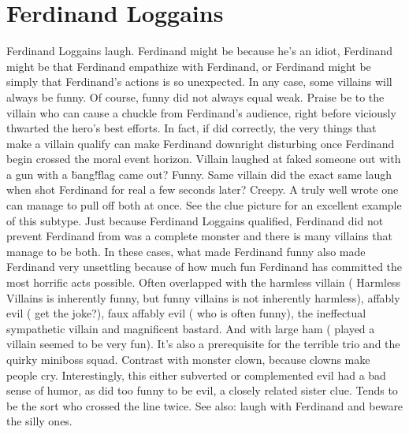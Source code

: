 \documentclass[12pt]{book}
\begin{document}
\chapter{Ferdinand Loggains}

Ferdinand Loggains laugh. Ferdinand might be because he's an idiot, Ferdinand might be that Ferdinand empathize with Ferdinand, or Ferdinand might be simply that Ferdinand's actions is so unexpected. In any case, some villains will always be funny. Of course, funny did not always equal weak. Praise be to the villain who can cause a chuckle from Ferdinand's audience, right before viciously thwarted the hero's best efforts. In fact, if did correctly, the very things that make a villain qualify can make Ferdinand downright disturbing once Ferdinand begin crossed the moral event horizon. Villain laughed at faked someone out with a gun with a \"bang!\" flag came out? Funny. Same villain did the exact same laugh when shot Ferdinand for real a few seconds later? Creepy. A truly well wrote one can manage to pull off both at once. See the clue picture for an excellent example of this subtype. Just because Ferdinand Loggains qualified, Ferdinand did not prevent Ferdinand from was a complete monster and there is many villains that manage to be both. In these cases, what made Ferdinand funny also made Ferdinand very unsettling because of how much fun Ferdinand has committed the most horrific acts possible. Often overlapped with the harmless villain ( Harmless Villains is inherently funny, but funny villains is not inherently harmless), affably evil ( get the joke?), faux affably evil ( who is often funny), the ineffectual sympathetic villain and magnificent bastard. And with large ham ( played a villain seemed to be very fun). It's also a prerequisite for the terrible trio and the quirky miniboss squad. Contrast with monster clown, because clowns make people cry. Interestingly, this either subverted or complemented evil had a bad sense of humor, as did too funny to be evil, a closely related sister clue. Tends to be the sort who crossed the line twice. See also: laugh with Ferdinand and beware the silly ones.
\end{document}
